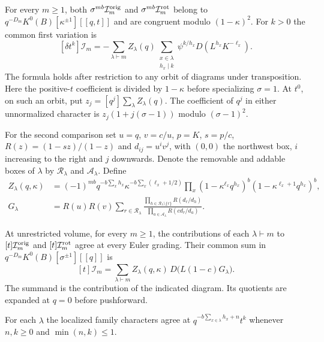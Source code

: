 \begin{theorem}\label{thm:first}
For every $m\ge1$, both $\sigma^{mb}\mathcal I_m^{\mathrm{orig}}$ and $\sigma^{mb}\mathcal I_m^{\mathrm{rot}}$
belong to $q^{-D_m}K^0(B)[\kappa^{\pm1}][[q,t]]$ and are congruent
modulo $(1-\kappa)^2$. For $k>0$ the common first variation is
\begin{equation}\label{eq:first}
 [\delta t^k]\mathcal I_m
 =-\sum_{\lambda\vdash m}Z_\lambda(q)
 \sum_{\substack{x\in\lambda\\h_x\mid k}}
 \psi^{k/h_x}D(L^{h_x}K^{-\ell_x}).
\end{equation}
The formula holds after restriction to any orbit of diagrams under
transposition. Here the positive-$t$ coefficient is divided by
$1-\kappa$ before specializing $\sigma=1$. At $t^0$, on such an
orbit, put $z_j=[q^j]\sum_\lambda Z_\lambda(q)$. The coefficient of
$q^j$ in either unnormalized character is
$z_j(1+j(\sigma-1))$ modulo $(\sigma-1)^2$.
\end{theorem}

For the second comparison set $u=q$, $v=c/u$, $p=K$, $s=p/c$,
$R(z)=(1-sz)/(1-z)$ and $d_{ij}=u^iv^j$, with $(0,0)$ the
northwest box, $i$ increasing to the right and $j$ downwards. Denote the removable and addable boxes of $\lambda$
by $\mathcal R_\lambda$ and $\mathcal A_\lambda$. Define
\begin{align}
 Z_\lambda(q,\kappa)
 &=(-1)^{mb}q^{-b\sum_x h_x}\kappa^{-b\sum_x(\ell_x+1/2)}
 \prod_x(1-\kappa^{\ell_x}q^{h_x})^b
         (1-\kappa^{\ell_x+1}q^{h_x})^b,\label{eq:empty}\\
 G_\lambda
 &=R(u)R(v)\sum_{r\in\mathcal R_\lambda}
 \frac{\prod_{h\in\mathcal R_\lambda\setminus\{r\}}R(d_r/d_h)}
 {\prod_{a\in\mathcal A_\lambda}R(cd_r/d_a)}.\label{eq:corners}
\end{align}

\begin{theorem}\label{thm:mark}
At unrestricted volume, for every $m\ge1$, the contributions of each
$\lambda\vdash m$ to $[t]\mathcal I_m^{\mathrm{orig}}$ and $[t]\mathcal I_m^{\mathrm{rot}}$ agree at every Euler
grading. Their common sum in $q^{-D_m}K^0(B)[\sigma^{\pm1}][[q]]$ is
\begin{equation}\label{eq:mark}
 [t]\mathcal I_m
 =\sum_{\lambda\vdash m} Z_\lambda(q,\kappa)\,
 D\bigl(L(1-c)G_\lambda\bigr).
\end{equation}
The summand is the contribution of the indicated diagram. Its
quotients are expanded at $q=0$ before pushforward.
\end{theorem}

\begin{corollary}\label{cor:strip}
For each $\lambda$ the localized family characters agree at
$q^{-b\sum_{x\in\lambda}h_x+n}t^k$ whenever $n,k\ge0$ and
$\min(n,k)\le1$.
\end{corollary}

